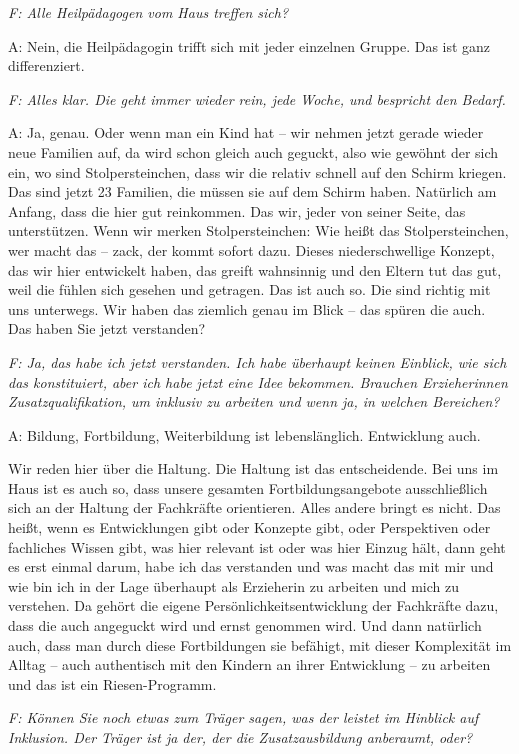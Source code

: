 \begin{linenumbers*}
\emph{F: Alle Heilpädagogen vom Haus treffen sich?} 

A: Nein, die Heilpädagogin trifft sich mit jeder einzelnen Gruppe. Das ist ganz differenziert.

\emph{F: Alles klar. Die geht immer wieder rein, jede Woche, und bespricht den Bedarf.} 

A: Ja, genau. Oder wenn man ein Kind hat -- wir nehmen jetzt gerade wieder neue Familien auf, da wird schon gleich auch geguckt, also wie gewöhnt der sich ein, wo sind Stolpersteinchen, dass wir die relativ schnell auf den Schirm kriegen. Das sind jetzt 23 Familien, die müssen sie auf dem Schirm haben. Natürlich am Anfang, dass die hier gut reinkommen. Das wir, jeder von seiner Seite, das unterstützen. Wenn wir merken Stolpersteinchen: Wie heißt das Stolpersteinchen, wer macht das -- zack, der kommt sofort dazu.
Dieses niederschwellige Konzept, das wir hier entwickelt haben, das greift wahnsinnig und den Eltern tut das gut, weil die fühlen sich gesehen und getragen. Das ist auch so. Die sind richtig mit uns unterwegs. Wir haben das ziemlich genau im Blick -- das spüren die auch. Das haben Sie jetzt verstanden?

\emph{F: Ja, das habe ich jetzt verstanden. Ich habe überhaupt keinen Einblick, wie sich das konstituiert, aber ich habe jetzt eine Idee bekommen. Brauchen Erzieherinnen Zusatzqualifikation, um inklusiv zu arbeiten und wenn ja, in welchen Bereichen?}

A: Bildung, Fortbildung, Weiterbildung ist lebenslänglich. Entwicklung auch. 

Wir reden hier über die Haltung. Die Haltung ist das entscheidende. Bei uns im Haus ist es auch so, dass unsere gesamten Fortbildungsangebote ausschließlich sich an der Haltung der Fachkräfte orientieren. Alles andere bringt es nicht. Das heißt, wenn es Entwicklungen gibt oder Konzepte gibt, oder Perspektiven oder fachliches Wissen gibt, was hier relevant ist oder was hier Einzug hält, dann geht es erst einmal darum, habe ich das verstanden und was macht das mit mir und wie bin ich in der Lage überhaupt als Erzieherin zu arbeiten und mich zu verstehen. Da gehört die eigene Persönlichkeitsentwicklung der Fachkräfte dazu, dass die auch angeguckt wird und ernst genommen wird. Und dann natürlich auch, dass man durch diese Fortbildungen sie befähigt, mit dieser Komplexität im Alltag -- auch authentisch mit den Kindern an ihrer Entwicklung -- zu arbeiten und das ist ein Riesen-Programm. 

\emph{F: Können Sie noch etwas zum Träger sagen, was der leistet im Hinblick auf Inklusion. Der Träger ist ja der, der die Zusatzausbildung anberaumt, oder?}


\end{linenumbers*}
